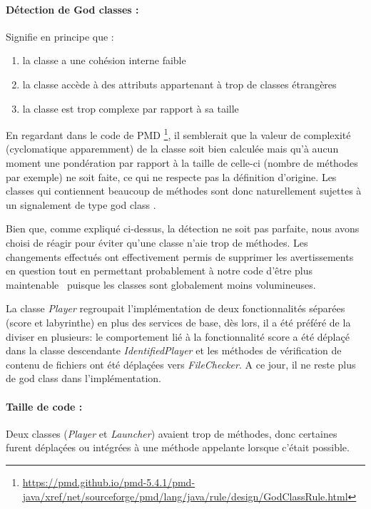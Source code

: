 \documentclass[12pt, openany]{report}
\begin{document}
\paragraph{Détection de \og God classes \fg : }
Signifie en principe que :
\begin{enumerate}
	\item la classe a une \og cohésion interne \fg faible
	\item la classe accède à des attributs appartenant à trop de classes étrangères
	\item la classe est trop complexe par rapport à sa taille
\end{enumerate}
En regardant dans le code de PMD \footnote{\url{https://pmd.github.io/pmd-5.4.1/pmd-java/xref/net/sourceforge/pmd/lang/java/rule/design/GodClassRule.html}}, il semblerait que la valeur de complexité (cyclomatique apparemment) de la classe soit bien calculée mais qu'à aucun moment une pondération par rapport à la taille de celle-ci (nombre de méthodes par exemple) ne soit faite, ce qui ne respecte pas la définition d'origine.
Les classes qui contiennent beaucoup de méthodes sont donc naturellement sujettes à un signalement de type \og god class \fg.

Bien que, comme expliqué ci-dessus, la détection ne soit pas parfaite, nous avons choisi de réagir pour éviter qu'une classe n'aie trop de méthodes. Les changements effectués ont effectivement permis de supprimer les avertissements en question tout en permettant probablement à notre code d'être plus \og maintenable \fg \, puisque les classes sont globalement moins volumineuses.

La classe \mbox{\textit{Player}} regroupait l'implémentation de deux fonctionnalités séparées (score et labyrinthe) en plus des services de base, dès lors, il a été préféré de la diviser en plusieurs: le comportement lié à la fonctionnalité \og score \fg a été déplaçé dans la classe descendante \mbox{\textit{IdentifiedPlayer}} et les méthodes de vérification de contenu de fichiers ont été déplaçées vers \mbox{\textit{FileChecker}}.
A ce jour, il ne reste plus de \og god class \fg dans l'implémentation.


\paragraph{Taille de code : }

Deux classes (\mbox{\textit{Player}} et \mbox{\textit{Launcher}}) avaient trop de méthodes, donc certaines furent déplaçées ou intégrées à une méthode appelante lorsque c'était possible.
\end{document}
